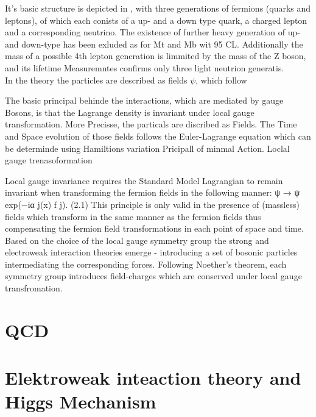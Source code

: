 It's basic structure is depicted in   , with three generations of fermions (quarks and leptons), of which each conists of a up- and a down type quark, a charged lepton and a corresponding neutrino.  The existence of further heavy  generation of up- and down-type has been exluded as for Mt and Mb wit 95 CL.
Additionally the mass of a possible 4th lepton generation is limmited by the mass of the Z boson, and its lifetime Measuremntes confirms only three light neutrion generatis. \\ 





In the theory the particles are described as fields $\psi$, which follow 

\noindent The basic principal behinde the interactions, which are mediated by gauge Bosons, is  that the Lagrange density is invariant under local gauge transformation. More Precisse, the particals are discribed as Fields. The Time and Space evolution of those fields follows the Euler-Lagrange equation which can be determinde using Hamiltions variation Pricipall of minmal Action. 
Loclal gauge trenasoformation



Local gauge invariance requires the Standard Model Lagrangian to remain invariant when transforming the fermion fields in the following manner:
ψ → ψ exp(−iα j(x) f j). (2.1)
This principle is only valid in the presence of (massless) fields which transform in the same manner as the fermion fields thus compensating the fermion field transformations in each point of space and time. Based on the choice of the local gauge symmetry group the strong and electroweak interaction theories emerge - introducing a set of bosonic particles intermediating the corresponding forces. Following Noether’s theorem, each symmetry group introduces field-charges which are conserved under local gauge transfromation.





\clearpage

\clearpage


\section{QCD}


\clearpage
\section{Elektroweak inteaction theory and Higgs Mechanism}


\clearpage